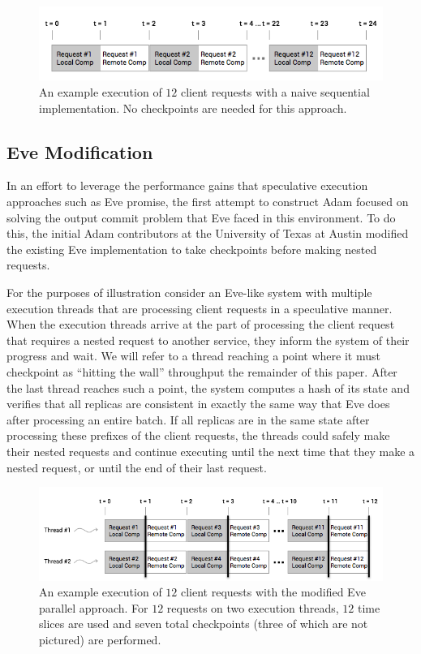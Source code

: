 \documentclass[11pt, oneside]{report}
\begin{document}
\begin{figure}[h]
\centering
\includegraphics[width=1.0\textwidth]{NaiveSequential.png}
\caption{\label{NaiveSequential}An example execution of $12$ client requests with a naive sequential implementation. No checkpoints are needed for this approach.}
\end{figure}

\subsection{Eve Modification}\label{EveModification}

In an effort to leverage the performance gains that speculative execution approaches such as Eve promise, the first attempt to construct Adam focused on solving the output commit problem that Eve faced in this environment. 
To do this, the initial Adam contributors at the University of Texas at Austin modified the existing Eve implementation to take checkpoints before making nested requests. 

For the purposes of illustration consider an Eve-like system with multiple execution threads that are processing client requests in a speculative manner. 
When the execution threads arrive at the part of processing the client request that requires a nested request to another service, they inform the system of their progress and wait.
We will refer to a thread reaching a point where it must checkpoint as ``hitting the wall'' throughput the remainder of this paper.
After the last thread reaches such a point, the system computes a hash of its state and verifies that all replicas are consistent in exactly the same way that Eve does after processing an entire batch. 
If all replicas are in the same state after processing these prefixes of the client requests, the threads could safely make their nested requests and continue executing until the next time that they make a nested request, or until the end of their last request.

\begin{figure}[h]
\centering
\includegraphics[width=1.0\textwidth]{Parallel.png}
\caption{\label{parallel}An example execution of $12$ client requests with the modified Eve parallel approach. For $12$ requests on two execution threads, $12$ time slices are used and seven total checkpoints (three of which are not pictured) are performed.}
\end{figure}
\end{document}
